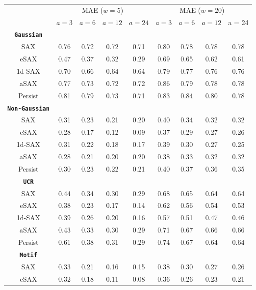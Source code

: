 \begin{table}[htb]
\centering
\begin{tabular}{ccccccccc} 
\toprule
& \multicolumn{4}{c}{\ac{MAE} ($w = 5$)} & \multicolumn{4}{c}{\ac{MAE} ($w = 20$)} \\
\cmidrule(lr){2-5} \cmidrule(lr){6-9}
& $a = 3$ & $a = 6$ & $a = 12$ & $a = 24$ & $a = 3$ & $a = 6$ & $a = 12$ & a = 24 \\
\midrule
\textbf{\texttt{Gaussian}} &  &  &  & \\
\ac{SAX} & 0.76 & 0.72 & 0.72 & 0.71 & 0.80 & 0.78 & 0.78 & 0.78 \\
\ac{eSAX} & 0.47 & 0.37 & 0.32 & 0.29 & 0.69 & 0.65 & 0.62 & 0.61 \\
\ac{1d-SAX} & 0.70 & 0.66 & 0.64 & 0.64 & 0.79 & 0.77 & 0.76 & 0.76 \\
\ac{aSAX} & 0.77 & 0.73 & 0.72 & 0.72 & 0.86 & 0.79 & 0.78 & 0.78 \\
Persist & 0.81 & 0.79 & 0.73 & 0.71 & 0.83 & 0.84 & 0.80 & 0.78 \\
\midrule
\textbf{\texttt{Non-Gaussian}} &  &  &  & \\
\ac{SAX} & 0.31 & 0.23 & 0.21 & 0.20 & 0.40 & 0.34 & 0.32 & 0.32 \\
\ac{eSAX} & 0.28 & 0.17 & 0.12 & 0.09 & 0.37 & 0.29 & 0.27 & 0.26 \\
\ac{1d-SAX} & 0.31 & 0.22 & 0.18 & 0.17 & 0.39 & 0.30 & 0.27 & 0.25 \\
\ac{aSAX} & 0.28 & 0.21 & 0.20 & 0.20 & 0.38 & 0.33 & 0.32 & 0.32 \\
Persist & 0.30 & 0.23 & 0.22 & 0.21 & 0.40 & 0.37 & 0.36 & 0.35 \\
\midrule
\textbf{\texttt{UCR}} &  &  &  & \\
\ac{SAX} & 0.44 & 0.34 & 0.30 & 0.29 & 0.68 & 0.65 & 0.64 & 0.64 \\
\ac{eSAX} & 0.38 & 0.23 & 0.17 & 0.14 & 0.62 & 0.56 & 0.54 & 0.53 \\
\ac{1d-SAX} & 0.39 & 0.26 & 0.20 & 0.16 & 0.57 & 0.51 & 0.47 & 0.46 \\
\ac{aSAX} & 0.43 & 0.33 & 0.30 & 0.29 & 0.71 & 0.67 & 0.66 & 0.66 \\
Persist & 0.61 & 0.38 & 0.31 & 0.29 & 0.74 & 0.67 & 0.64 & 0.64 \\
\midrule
\textbf{\texttt{Motif}} &  &  &  & \\
\ac{SAX} & 0.33 & 0.21 & 0.16 & 0.15 & 0.38 & 0.30 & 0.27 & 0.26 \\
\ac{eSAX} & 0.32 & 0.18 & 0.11 & 0.08 & 0.36 & 0.26 & 0.23 & 0.21 \\

\end{tabular}
\end{table}
